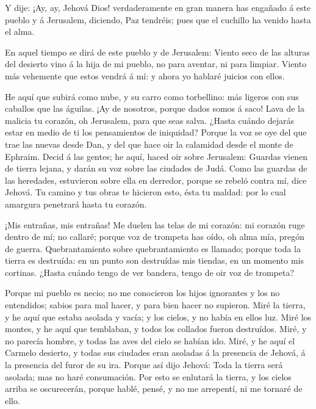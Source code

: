  Y dije: ¡Ay, ay, Jehová Dios! verdaderamente en gran
manera has engañado á este pueblo y á Jerusalem, diciendo, Paz tendréis;
pues que el cuchillo ha venido hasta el alma.

 En aquel tiempo se dirá de este pueblo y de Jerusalem:
Viento seco de las alturas del desierto vino á la hija de mi pueblo, no
para aventar, ni para limpiar.  Viento más vehemente que
estos vendrá á mí: y ahora yo hablaré juicios con ellos.

 He aquí que subirá como nube, y su carro como torbellino:
más ligeros con sus caballos que las águilas. ¡Ay de nosotros, porque
dados somos á saco!  Lava de la malicia tu corazón, oh
Jerusalem, para que seas salva. ¿Hasta cuándo dejarás estar en medio de
ti los pensamientos de iniquidad?  Porque la voz se oye del
que trae las nuevas desde Dan, y del que hace oir la calamidad desde el
monte de Ephraim.  Decid á las gentes; he aquí, haced oir
sobre Jerusalem: Guardas vienen de tierra lejana, y darán su voz sobre
las ciudades de Judá.  Como las guardas de las heredades,
estuvieron sobre ella en derredor, porque se rebeló contra mí, dice
Jehová.  Tu camino y tus obras te hicieron esto, ésta tu
maldad: por lo cual amargura penetrará hasta tu corazón.

 ¡Mis entrañas, mis entrañas! Me duelen las telas de mi
corazón: mi corazón ruge dentro de mí; no callaré; porque voz de
trompeta has oído, oh alma mía, pregón de guerra. 
Quebrantamiento sobre quebrantamiento es llamado; porque toda la tierra
es destruída: en un punto son destruídas mis tiendas, en un momento mis
cortinas.  ¿Hasta cuándo tengo de ver bandera, tengo de oir
voz de trompeta?

 Porque mi pueblo es necio; no me conocieron los hijos
ignorantes y los no entendidos; sabios para mal hacer, y para bien hacer
no supieron.  Miré la tierra, y he aquí que estaba asolada
y vacía; y los cielos, y no había en ellos luz.  Miré los
montes, y he aquí que temblaban, y todos los collados fueron destruídos.
 Miré, y no parecía hombre, y todas las aves del cielo se
habían ido.  Miré, y he aquí el Carmelo desierto, y todas
sus ciudades eran asoladas á la presencia de Jehová, á la presencia del
furor de su ira.  Porque así dijo Jehová: Toda la tierra
será asolada; mas no haré consumación.  Por esto se
enlutará la tierra, y los cielos arriba se oscurecerán, porque hablé,
pensé, y no me arrepentí, ni me tornaré de ello.

